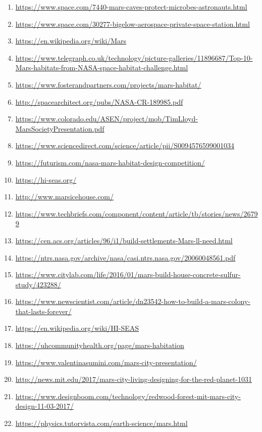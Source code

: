 \documentclass{article}
\begin{document}
\begin{enumerate}
  \item \url{https://www.space.com/7440-mars-caves-protect-microbes-astronauts.html}
  \item \url{https://www.space.com/30277-bigelow-aerospace-private-space-station.html}
  \item \url{https://en.wikipedia.org/wiki/Mars}
  \item \url{https://www.telegraph.co.uk/technology/picture-galleries/11896687/Top-10-Mars-habitats-from-NASA-space-habitat-challenge.html}
  \item \url{https://www.fosterandpartners.com/projects/mars-habitat/}
  \item \url{http://spacearchitect.org/pubs/NASA-CR-189985.pdf}
  \item \url{https://www.colorado.edu/ASEN/project/mob/TimLloyd-MarsSocietyPresentation.pdf}
  \item \url{https://www.sciencedirect.com/science/article/pii/S0094576599001034}
  \item \url{https://futurism.com/nasa-mars-habitat-design-competition/}
  \item \url{https://hi-seas.org/}
  \item \url{http://www.marsicehouse.com/}
  \item \url{https://www.techbriefs.com/component/content/article/tb/stories/news/26799}
  \item \url{https://cen.acs.org/articles/96/i1/build-settlements-Mars-ll-need.html}
  \item \url{https://ntrs.nasa.gov/archive/nasa/casi.ntrs.nasa.gov/20060048561.pdf}
  \item \url{https://www.citylab.com/life/2016/01/mars-build-house-concrete-sulfur-study/423288/}
  \item \url{https://www.newscientist.com/article/dn23542-how-to-build-a-mars-colony-that-lasts-forever/}
  \item \url{https://en.wikipedia.org/wiki/HI-SEAS}
  \item \url{https://uhcommunityhealth.org/page/mars-habitation}
  \item \url{https://www.valentinasumini.com/mars-city-presentation/}
  \item \url{http://news.mit.edu/2017/mars-city-living-designing-for-the-red-planet-1031}
  \item \url{https://www.designboom.com/technology/redwood-forest-mit-mars-city-design-11-03-2017/}
  \item \url{https://physics.tutorvista.com/earth-science/mars.html}

\end{enumerate}
\end{document}
